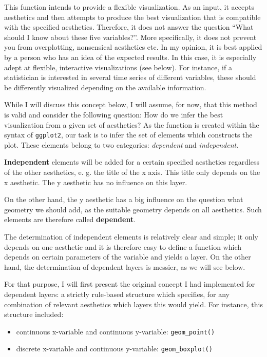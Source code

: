 \documentclass[]{report}
\providecommand{\tightlist}{%
  \setlength{\itemsep}{0pt}\setlength{\parskip}{0pt}}
\theoremstyle{definition}
\theoremstyle{definition}
\theoremstyle{definition}
\theoremstyle{remark}
\begin{document}
This function intends to provide a flexible visualization. As an input,
it accepts aesthetics and then attempts to produce the best
visualization that is compatible with the specified aesthetics.
Therefore, it does not answer the question ``What should I know about
these five variables?''. More specifically, it does not prevent you from
overplotting, nonsensical aesthetics etc. In my opinion, it is best
applied by a person who has an idea of the expected results. In this
case, it is especially adept at flexible, interactive visualizations
(see below). For instance, if a statistician is interested in several
time series of different variables, these should be differently
visualized depending on the available information.

While I will discuss this concept below, I will assume, for now, that
this method is valid and consider the following question: How do we
infer the best visualization from a given set of aesthetics? As the
function is created within the syntax of \texttt{ggplot2}, our task is
to infer the set of elements which constructs the plot. These elements
belong to two categories: \emph{dependent} and \emph{independent}.

\textbf{Independent} elements will be added for a certain specified
aesthetics regardless of the other aesthetics, e. g. the title of the x
axis. This title only depends on the x aesthetic. The y aesthetic has no
influence on this layer.

On the other hand, the y aesthetic has a big influence on the question
what geometry we should add, as the suitable geometry depends on all
aesthetics. Such elements are therefore called \textbf{dependent}.

The determination of independent elements is relatively clear and
simple; it only depends on one aesthetic and it is therefore easy to
define a function which depends on certain parameters of the variable
and yields a layer. On the other hand, the determination of dependent
layers is messier, as we will see below.

For that purpose, I will first present the original concept I had
implemented for dependent layers: a strictly rule-based structure which
specifies, for any combination of relevant aesthetics which layers this
would yield. For instance, this structure included:

\begin{itemize}
\tightlist
\item
  continuous x-variable and continuous y-variable:
  \texttt{geom\_point()}
\item
  discrete x-variable and continuous y-variable:
  \texttt{geom\_boxplot()}
\end{itemize}
\end{document}
